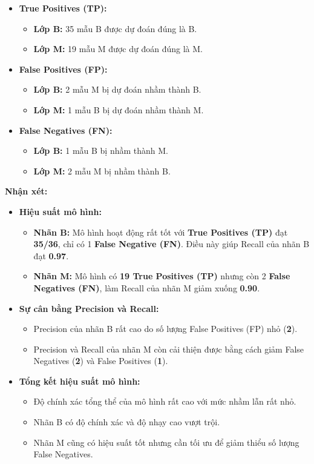\begin{itemize}
	\item \textbf{True Positives (TP):}
	\begin{itemize}
		\item \textbf{Lớp B:} 35 mẫu B được dự đoán đúng là B.
		\item \textbf{Lớp M:} 19 mẫu M được dự đoán đúng là M.
	\end{itemize}
	
	\item \textbf{False Positives (FP):}
	\begin{itemize}
		\item \textbf{Lớp B:} 2 mẫu M bị dự đoán nhầm thành B.
		\item \textbf{Lớp M:} 1 mẫu B bị dự đoán nhầm thành M.
	\end{itemize}
	
	\item \textbf{False Negatives (FN):}
	\begin{itemize}
		\item \textbf{Lớp B:} 1 mẫu B bị nhầm thành M.
		\item \textbf{Lớp M:} 2 mẫu M bị nhầm thành B.
	\end{itemize}
\end{itemize}

\textbf{Nhận xét:}
\begin{itemize}
	\item \textbf{Hiệu suất mô hình:}
	\begin{itemize}
		\item \textbf{Nhãn B:} Mô hình hoạt động rất tốt với \textbf{True Positives (TP)} đạt \textbf{35/36}, chỉ có 1 \textbf{False Negative (FN)}. Điều này giúp Recall của nhãn B đạt \textbf{0.97}.
		\item \textbf{Nhãn M:} Mô hình có \textbf{19 True Positives (TP)} nhưng còn 2 \textbf{False Negatives (FN)}, làm Recall của nhãn M giảm xuống \textbf{0.90}.
	\end{itemize}
	
	\item \textbf{Sự cân bằng Precision và Recall:}
	\begin{itemize}
		\item Precision của nhãn B rất cao do số lượng False Positives (FP) nhỏ (\textbf{2}).
		\item Precision và Recall của nhãn M còn cải thiện được bằng cách giảm False Negatives (\textbf{2}) và False Positives (\textbf{1}).
	\end{itemize}
	
	\item \textbf{Tổng kết hiệu suất mô hình:}
	\begin{itemize}
		\item Độ chính xác tổng thể của mô hình rất cao với mức nhầm lẫn rất nhỏ.
		\item Nhãn B có độ chính xác và độ nhạy cao vượt trội.
		\item Nhãn M cũng có hiệu suất tốt nhưng cần tối ưu để giảm thiểu số lượng False Negatives.
	\end{itemize}
\end{itemize}




